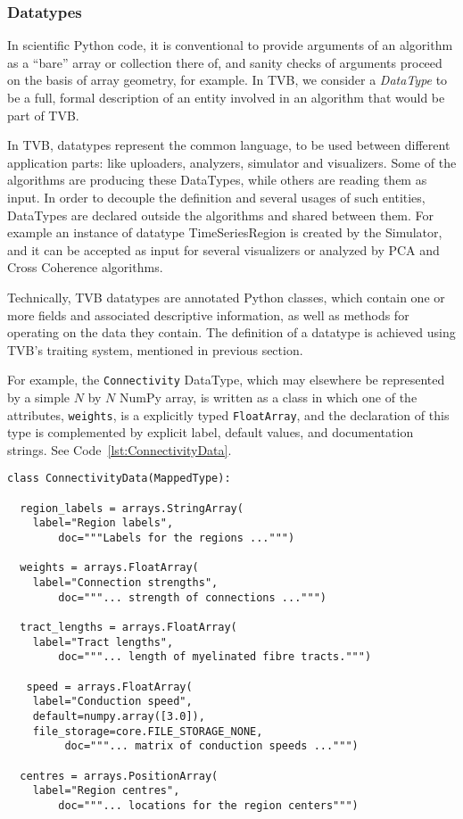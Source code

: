 \subsubsection{Datatypes}

In scientific Python code, it is conventional to provide arguments
of an algorithm as a ``bare'' array or collection there of, and sanity
checks of arguments proceed on the basis of array geometry, for example.
In TVB, we consider a \textit{DataType} to be a full, formal description of 
an entity involved in an algorithm that would be part of TVB. 

In TVB, datatypes represent the common language, to be used between different
application parts: like uploaders, analyzers, simulator and visualizers.
Some of the algorithms are producing these DataTypes, while others are reading
them as input.  In order to decouple the definition and several usages of such
entities, DataTypes are declared outside the algorithms and shared between them.
For example an instance of datatype TimeSeriesRegion is created by the
Simulator, and it can be accepted as input for several visualizers or analyzed
by PCA and Cross Coherence algorithms.

Technically, TVB datatypes are annotated Python classes, which
contain one or more fields and associated descriptive information, as
well as methods for operating on the data they contain. The definition of a
datatype is achieved using TVB's traiting system, mentioned in previous section.

For example, the \texttt{Connectivity} DataType, which may elsewhere
be represented by a simple $N$ by $N$ NumPy array, is written as a class
in which one of the attributes, \texttt{weights}, is a explicitly typed 
\texttt{FloatArray}, and the declaration of this type is complemented by
explicit label, default values, and documentation strings. See
Code~\ref{lst:ConnectivityData}.

\begin{lstlisting}[caption={The COnnectivityData listing},
                   label={lst:ConnectivityData}]
class ConnectivityData(MappedType):

  region_labels = arrays.StringArray( 
	label="Region labels", 
        doc="""Labels for the regions ...""")

  weights = arrays.FloatArray( 
	label="Connection strengths",
        doc="""... strength of connections ...""")

  tract_lengths = arrays.FloatArray( 
	label="Tract lengths",
        doc="""... length of myelinated fibre tracts.""")

   speed = arrays.FloatArray( 
	label="Conduction speed", 
	default=numpy.array([3.0]), 
	file_storage=core.FILE_STORAGE_NONE,
         doc="""... matrix of conduction speeds ...""")

  centres = arrays.PositionArray( 
	label="Region centres",
        doc="""... locations for the region centers""")
\end{lstlisting}
	
